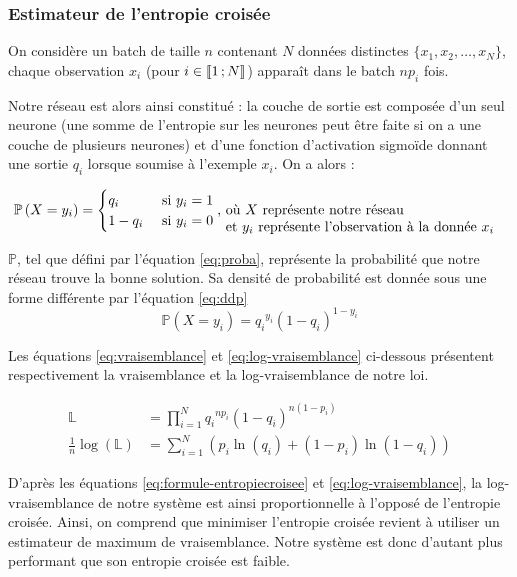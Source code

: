 \subsubsection{Estimateur de l'entropie croisée}

On considère un batch de taille $n$ contenant $N$ données distinctes $\{x_1, x_2, \ldots, x_N\}$, chaque observation $x_i$ 
(pour $i \in \mathopen{\llbracket}1\,;N\mathclose{\rrbracket}$) apparaît dans le batch $np_i$ fois.

Notre réseau est alors ainsi constitué : la couche de sortie est composée d'un seul neurone (une somme de l'entropie sur les neurones peut être faite si on a une couche de plusieurs neurones) et d'une fonction d'activation sigmoïde donnant une sortie $q_i$ lorsque soumise à l'exemple $x_i$. On a alors :

\begin{equation}
 \mathbb{P}\left(X=y_i\right) = \begin{cases}q_i &\text{ si $y_i=1$}\\1-q_i &\text{ si $y_i=0$}\end{cases} \text{, \parbox[t]{20em}{où $X$ représente notre réseau\\
 et $y_i$ représente l'observation à la donnée $x_i$}}
 \label{eq:proba}
\end{equation}

$\mathbb{P}$, tel que défini par l'équation \ref{eq:proba}, représente la probabilité que notre réseau trouve la bonne solution. Sa densité de probabilité est donnée sous une forme différente par l'équation \ref{eq:ddp}
\begin{equation}
 \label{eq:ddp}
 \mathbb{P}\left(X=y_i\right) = q_i{^{y_i}}\left(1-q_i\right)^{1-y_i}
\end{equation}

Les équations \ref{eq:vraisemblance} et \ref{eq:log-vraisemblance} ci-dessous présentent respectivement la vraisemblance et la log-vraisemblance de notre loi.

\begin{align}
 \mathbb{L} &= \prod_{i=1}^N q_i{^{np_i}}\left(1-q_i\right)^{n(1-p_i)}
 \label{eq:vraisemblance}\\
 \frac{1}{n}\log\left(\mathbb{L}\right) &= \sum_{i=1}^N \left(p_i\ln\left(q_i\right) + \left(1-p_i\right)\ln\left(1-q_i\right) \right)
 \label{eq:log-vraisemblance}
\end{align}

D'après les équations \ref{eq:formule-entropiecroisee} et \ref{eq:log-vraisemblance}, la log-vraisemblance de notre système est 
ainsi proportionnelle à l'opposé de l'entropie croisée. 
Ainsi, on comprend que minimiser l'entropie croisée revient à utiliser un estimateur de maximum de vraisemblance. 
Notre système est donc d'autant plus performant que son entropie croisée est faible.


